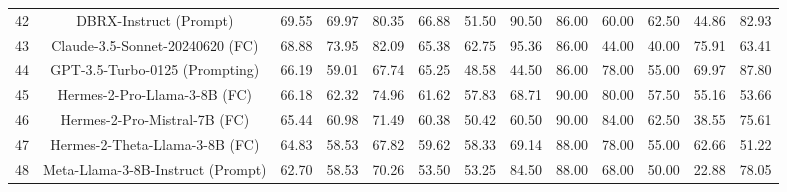 \documentclass{article}
\begin{document}
\begin{table}[h]
{\begin{tabular}{ccccccccccccc}
42                     & DBRX-Instruct (Prompt)                         & 69.55                         & 69.97  & 80.35    & 66.88    & 51.50                                                       & 90.50  & 86.00    & 60.00    & 62.50                                                       & 44.86                         & 82.93                       \\
43                     & Claude-3.5-Sonnet-20240620 (FC)                & 68.88                         & 73.95  & 82.09    & 65.38    & 62.75                                                       & 95.36  & 86.00    & 44.00    & 40.00                                                       & 75.91                         & 63.41                       \\
44                     & GPT-3.5-Turbo-0125 (Prompting)                 & 66.19                         & 59.01  & 67.74    & 65.25    & 48.58                                                       & 44.50  & 86.00    & 78.00    & 55.00                                                       & 69.97                         & 87.80                       \\
45                     & Hermes-2-Pro-Llama-3-8B (FC)                   & 66.18                         & 62.32  & 74.96    & 61.62    & 57.83                                                       & 68.71  & 90.00    & 80.00    & 57.50                                                       & 55.16                         & 53.66                       \\
46                     & Hermes-2-Pro-Mistral-7B (FC)                   & 65.44                         & 60.98  & 71.49    & 60.38    & 50.42                                                       & 60.50  & 90.00    & 84.00    & 62.50                                                       & 38.55                         & 75.61                       \\
47                     & Hermes-2-Theta-Llama-3-8B (FC)                 & 64.83                         & 58.53  & 67.82    & 59.62    & 58.33                                                       & 69.14  & 88.00    & 78.00    & 55.00                                                       & 62.66                         & 51.22                       \\
48                     & Meta-Llama-3-8B-Instruct (Prompt)              & 62.70                         & 58.53  & 70.26    & 53.50    & 53.25                                                       & 84.50  & 88.00    & 68.00    & 50.00                                                       & 22.88                         & 78.05                       \\

\end{tabular}}
\end{table}
\end{document}
